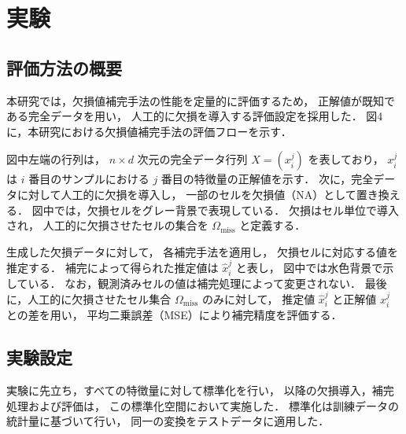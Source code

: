 \section{実験}\label{sec:experiment}
\subsection{評価方法の概要}

本研究では，欠損値補完手法の性能を定量的に評価するため，
正解値が既知である完全データを用い，
人工的に欠損を導入する評価設定を採用した．
図4に，本研究における欠損値補完手法の評価フローを示す．

図中左端の行列は，
$n \times d$ 次元の完全データ行列
$X = (x_i^j)$ を表しており，
$x_i^j$ は $i$ 番目のサンプルにおける
$j$ 番目の特徴量の正解値を示す．
次に，完全データに対して人工的に欠損を導入し，
一部のセルを欠損値（NA）として置き換える．
図中では，欠損セルをグレー背景で表現している．
欠損はセル単位で導入され，
人工的に欠損させたセルの集合を
$\Omega_{\mathrm{miss}}$ と定義する．

生成した欠損データに対して，
各補完手法を適用し，
欠損セルに対応する値を推定する．
補完によって得られた推定値は
$\hat{x}_i^j$ と表し，
図中では水色背景で示している．
なお，観測済みセルの値は補完処理によって変更されない．
最後に，人工的に欠損させたセル集合
$\Omega_{\mathrm{miss}}$ のみに対して，
推定値 $\hat{x}_i^j$ と正解値 $x_i^j$ との差を用い，
平均二乗誤差（MSE）により補完精度を評価する．

\subsection{実験設定}
実験に先立ち，すべての特徴量に対して標準化を行い，
以降の欠損導入，補完処理および評価は，
この標準化空間において実施した．
標準化は訓練データの統計量に基づいて行い，
同一の変換をテストデータに適用した．

